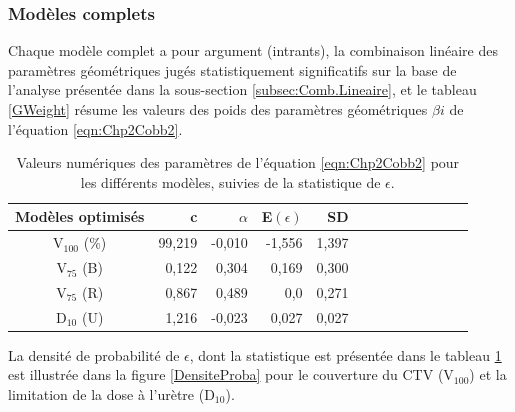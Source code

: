 \subsubsection{Modèles complets}
Chaque modèle complet a pour argument (intrants), la combinaison linéaire des paramètres géométriques jugés statistiquement significatifs sur la base de l'analyse présentée dans la sous-section \ref{subsec:Comb.Lineaire}, et le tableau \ref{GWeight} résume les valeurs des poids des paramètres géométriques $\beta{i}$ de l'équation \ref{eqn:Chp2Cobb2}.
%
\begin {table}[ht!]
\captionsetup{singlelinecheck=off, skip=4pt, width =\dimexpr \textwidth-6.3cm\relax}%
\centering
\caption{Valeurs numériques des paramètres de l'équation \eqref{eqn:Chp2Cobb2} pour les différents modèles, suivies de la statistique de $\epsilon$.}
\label{FrontierNumericalValues} 
\vspace{0.1cm}
\renewcommand{\arraystretch}{1.4}
    \begin{tabular}{crrrrrrrrrrrr}
	\toprule[1.3pt]
	\hline
        Modèles optimisés               &  c     & $\alpha$  & E$(\epsilon)$ & SD \\ 
        \hline
        V$_{100}$ (\%)       & 99,219 & -0,010 & -1,556 &  1,397  \\ 
		V$_{75}$ (B)   		 & 0,122  &  0,304   &  0,169   &   0,300  \\ 
		V$_{75}$ (R)         & 0,867  &   0,489   &  0,0   &   0,271  \\ 
		D$_{10}$ (U)         & 1,216  & -0,023    &  0,027   &   0,027 \\ 
        \bottomrule[1.3pt]
	\end{tabular} 
\end {table}
%
La densité de probabilité de $\epsilon$, dont la statistique est présentée dans le tableau \ref{FrontierNumericalValues} est illustrée dans la figure \ref{DensiteProba} pour le couverture du CTV (V$_{100}$) et la limitation de la dose à l'urètre (D$_{10}$).
%

